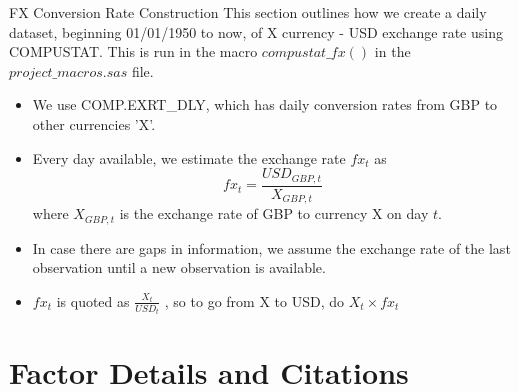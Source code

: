 \documentclass[12pt,title,fleqn]{article}
\begin{document}
\begin{section}{FX Conversion Rate Construction}
This section outlines how we create a daily dataset, beginning 01/01/1950 to now, of X currency - USD exchange rate using COMPUSTAT. This is run in the macro $compustat\_fx()$ in the $project\_macros.sas$ file.
    \begin{itemize}
        \item We use COMP.EXRT\_DLY, which has daily conversion rates from GBP to other currencies 'X'. 
        \item Every day available, we estimate the exchange rate $fx_t$ as 
            \begin{equation*}
                fx_t = \frac{USD_{GBP, t}}{X_{GBP, t}}
            \end{equation*}
            where $X_{GBP,t}$ is the exchange rate of GBP to currency X on day $t$. 
        \item In case there are gaps in information, we assume the exchange rate of the last observation until a new observation is available. 
        \item $fx_t$ is quoted as $\frac{X_t}{USD_t}$ , so to go from X to USD, do $X_t \times fx_t$
    \end{itemize}

\end{section}

\section{Factor Details and Citations}
\end{document}
